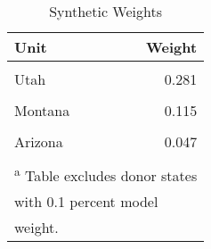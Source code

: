 \begin{table}[H]

\caption{\label{tab:unit_weight_table_washington}Synthetic Weights}
\centering
\begin{tabular}[t]{lr}
\toprule
Unit & Weight\\
\midrule
\cellcolor{gray!6}{Florida} & \cellcolor{gray!6}{0.282}\\
Utah & 0.281\\
\cellcolor{gray!6}{Connecticut} & \cellcolor{gray!6}{0.212}\\
Montana & 0.115\\
\cellcolor{gray!6}{Hawaii} & \cellcolor{gray!6}{0.048}\\
\addlinespace
Arizona & 0.047\\
\cellcolor{gray!6}{District of Columbia} & \cellcolor{gray!6}{0.015}\\
\bottomrule
\multicolumn{2}{l}{\textsuperscript{a} Table excludes donor states}\\
\multicolumn{2}{l}{with 0.1 percent model}\\
\multicolumn{2}{l}{weight.}\\
\end{tabular}
\end{table}
